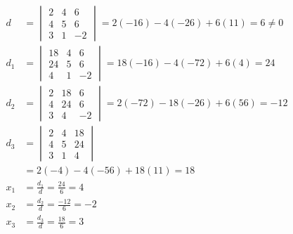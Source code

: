 \documentclass[11pt]{report}
\begin{document}
\begin{align}
d &= \begin{vmatrix}
     2 & 4 & 6 \\ 4 & 5 & 6 \\ 3 & 1 & -2
    \end{vmatrix}
= 2(-16) -4(-26) + 6(11) = 6 \neq 0 \\
d_1 &= \begin{vmatrix}
     18 & 4 & 6 \\ 24 & 5 & 6 \\ 4 & 1 & -2
    \end{vmatrix}
= 18(-16) -4(-72) + 6(4) = 24 \\
d_2 &= \begin{vmatrix}
     2 & 18 & 6 \\ 4 & 24 & 6 \\ 3 & 4 & -2
    \end{vmatrix}
= 2(-72) -18(-26) + 6(56) = -12 \\
d_3 &= \begin{vmatrix}
     2 & 4 & 18 \\ 4 & 5 & 24 \\ 3 & 1 & 4
    \end{vmatrix} \\
&= 2(-4) -4(-56) + 18(11) = 18 \\
x_1 &= \frac{d_1}{d} = \frac{24}{6} = 4 \\
x_2 &= \frac{d_2}{d} = \frac{-12}{6} = -2 \\
x_3 &= \frac{d_3}{d} = \frac{18}{6} = 3 
\end{align}

\end{document}
